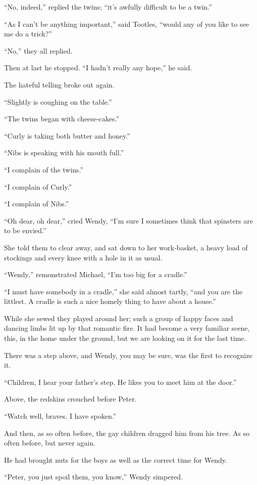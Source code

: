 “No, indeed,” replied the twins;
“it’s awfully difficult to be a twin.”

“As I can’t be anything important,” said Tootles,
“would any of you like to see me do a trick?”

“No,” they all replied.

Then at last he stopped.
“I hadn’t really any hope,” he said.

The hateful telling broke out again.

“Slightly is coughing on the table.”

“The twins began with cheese‐cakes.”

“Curly is taking both butter and honey.”

“Nibs is speaking with his mouth full.”

“I complain of the twins.”

“I complain of Curly.”

“I complain of Nibs.”

“Oh dear, oh dear,” cried Wendy,
“I’m sure I sometimes think that spinsters are to be envied.”

She told them to clear away,
and sat down to her work‐basket, a heavy load of stockings and every knee with a hole in it as usual.

“Wendy,” remonstrated Michael, “I’m too big for a cradle.”

“I must have somebody in a cradle,” she said almost tartly,
“and you are the littlest.
A cradle is such a nice homely thing to have about a house.”

While she sewed they played around her;
such a group of happy faces and dancing limbs lit up by that romantic fire.
It had become a very familiar scene, this, in the home under the ground,
but we are looking on it for the last time.

There was a step above, and Wendy, you may be sure, was the first to recognize it.

“Children, I hear your father’s step.
He likes you to meet him at the door.”

Above, the redskins crouched before Peter.

“Watch well, braves.
I have spoken.”

And then, as so often before, the gay children dragged him from his tree.
As so often before, but never again.

He had brought nuts for the boys as well as the correct time for Wendy.

“Peter, you just spoil them, you know,” Wendy simpered.

